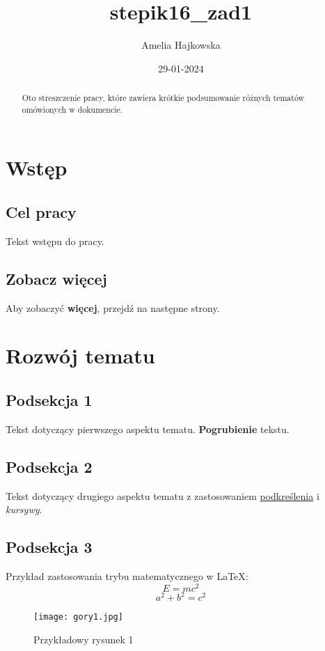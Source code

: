 \documentclass{article}
\title{stepik16_zad1}
\author{Amelia Hajkowska}
\date{29-01-2024}
\begin{document}
\maketitle

\begin{abstract}
Oto streszczenie pracy, które zawiera krótkie podsumowanie różnych tematów omówionych w dokumencie.
\end{abstract}

\tableofcontents
\listoffigures
\listoftables
\newpage

\section{Wstęp}
\subsection{Cel pracy}
Tekst wstępu do pracy. 
\subsection{Zobacz więcej}
Aby zobaczyć \textbf{więcej}, przejdź na następne strony.
\newpage

\section{Rozwój tematu}
\subsection{Podsekcja 1}
Tekst dotyczący pierwszego aspektu tematu. \textbf{Pogrubienie} tekstu.

\subsection{Podsekcja 2}
Tekst dotyczący drugiego aspektu tematu z zastosowaniem \underline{podkreślenia} i \textit{kursywy}.

\subsection{Podsekcja 3}
Przykład zastosowania trybu matematycznego w LaTeX:
\begin{equation}
    E = mc^2
\end{equation}
\begin{equation}
    a^2 + b^2 = c^2
\end{equation}

\begin{figure}[h]
\centering
\texttt{[image: gory1.jpg]}
\caption{Przykładowy rysunek 1}
\label{fig:rys1}
\end{figure}
\end{document}
